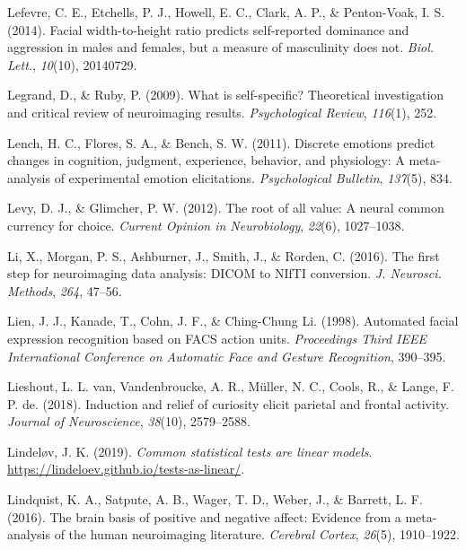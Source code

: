 \documentclass[11pt,american,a4paper,oneside,]{memoir} %
\begin{document}
\leavevmode\hypertarget{ref-Lefevre2014-vo}{}%
Lefevre, C. E., Etchells, P. J., Howell, E. C., Clark, A. P., \& Penton-Voak, I. S. (2014). Facial width-to-height ratio predicts self-reported dominance and aggression in males and females, but a measure of masculinity does not. \emph{Biol. Lett.}, \emph{10}(10), 20140729.

\leavevmode\hypertarget{ref-legrand2009self}{}%
Legrand, D., \& Ruby, P. (2009). What is self-specific? Theoretical investigation and critical review of neuroimaging results. \emph{Psychological Review}, \emph{116}(1), 252.

\leavevmode\hypertarget{ref-lench2011discrete}{}%
Lench, H. C., Flores, S. A., \& Bench, S. W. (2011). Discrete emotions predict changes in cognition, judgment, experience, behavior, and physiology: A meta-analysis of experimental emotion elicitations. \emph{Psychological Bulletin}, \emph{137}(5), 834.

\leavevmode\hypertarget{ref-levy2012root}{}%
Levy, D. J., \& Glimcher, P. W. (2012). The root of all value: A neural common currency for choice. \emph{Current Opinion in Neurobiology}, \emph{22}(6), 1027--1038.

\leavevmode\hypertarget{ref-Li2016-ss}{}%
Li, X., Morgan, P. S., Ashburner, J., Smith, J., \& Rorden, C. (2016). The first step for neuroimaging data analysis: DICOM to NIfTI conversion. \emph{J. Neurosci. Methods}, \emph{264}, 47--56.

\leavevmode\hypertarget{ref-Lien1998-bg}{}%
Lien, J. J., Kanade, T., Cohn, J. F., \& Ching-Chung Li. (1998). Automated facial expression recognition based on FACS action units. \emph{Proceedings Third IEEE International Conference on Automatic Face and Gesture Recognition}, 390--395.

\leavevmode\hypertarget{ref-van2018induction}{}%
Lieshout, L. L. van, Vandenbroucke, A. R., Müller, N. C., Cools, R., \& Lange, F. P. de. (2018). Induction and relief of curiosity elicit parietal and frontal activity. \emph{Journal of Neuroscience}, \emph{38}(10), 2579--2588.

\leavevmode\hypertarget{ref-Lindelov2019-jk}{}%
Lindeløv, J. K. (2019). \emph{Common statistical tests are linear models}. \url{https://lindeloev.github.io/tests-as-linear/}.

\leavevmode\hypertarget{ref-lindquist2016brain}{}%
Lindquist, K. A., Satpute, A. B., Wager, T. D., Weber, J., \& Barrett, L. F. (2016). The brain basis of positive and negative affect: Evidence from a meta-analysis of the human neuroimaging literature. \emph{Cerebral Cortex}, \emph{26}(5), 1910--1922.
\end{document}
